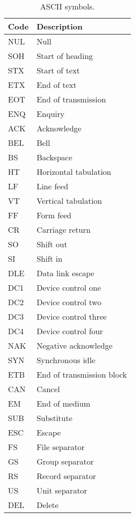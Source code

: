 \begin{table}
  \centering
  \begin{tabular}{|l|l|}
    \hline
    Code & Description\\
    \hline
    NUL & Null\\
    SOH & Start of heading\\
    STX & Start of text\\
    ETX & End of text\\
    EOT & End of transmission\\
    ENQ & Enquiry\\
    ACK & Acknowledge\\
    BEL & Bell\\
    BS & Backspace\\
    HT & Horizontal tabulation\\
    LF & Line feed\\
    VT & Vertical tabulation\\
    FF & Form feed\\
    CR & Carriage return\\
    SO & Shift out\\
    SI & Shift in\\
    DLE & Data link escape\\
    DC1 & Device control one\\
    DC2 & Device control two\\
    DC3 & Device control three\\
    DC4 & Device control four\\
    NAK & Negative acknowledge\\
    SYN & Synchronous idle\\
    ETB & End of transmission block\\
    CAN & Cancel\\
    EM & End of medium\\
    SUB & Substitute\\
    ESC & Escape\\
    FS & File separator\\
    GS & Group separator\\
    RS & Record separator\\
    US & Unit separator\\
    DEL & Delete\\
    \hline
  \end{tabular}
  \caption{ASCII symbols.}
  \label{tab:asciiSpecialSymbols}
\end{table}


